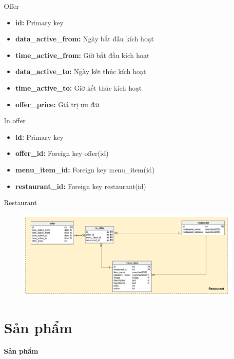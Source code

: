 \documentclass[aspectratio=43,xcolor=dvipsnames]{beamer}
\begin{document}
	\begin{frame}{Offer}
		\begin{itemize}
			\item \textbf{id:} Primary key
			\item \textbf{data\_active\_from:} Ngày bắt đầu kích hoạt
			\item \textbf{time\_active\_from:} Giờ bắt đầu kích hoạt
			\item \textbf{data\_active\_to:} Ngày kết thúc kích hoạt
			\item \textbf{time\_active\_to:} Giờ kết thúc kích hoạt
			\item \textbf{offer\_price:} Giá trị ưu đãi
		\end{itemize}
	\end{frame}
	\begin{frame}{In offer}
		\begin{itemize}
			\item \textbf{id:} Primary key
			\item \textbf{offer\_id: } Foreign key offer(id)
			\item \textbf{menu\_item\_id: } Foreign key menu\_item(id)
			\item \textbf{restaurant\_id: } Foreign key restaurant(id)
		\end{itemize}
	\end{frame}

	\begin{frame}{Restaurant}
		\begin{figure}[ht!]
			\centerline{\includegraphics[width=1\textwidth]{restaurant.png}}
			\label{fig:ass1}
		\end{figure}
	\end{frame}
	
	\section{Sản phẩm}
	\begin{frame}
		\textcolor{structure}{\Huge{\textbf{Sản phẩm}}}
	\end{frame}
\end{document}
